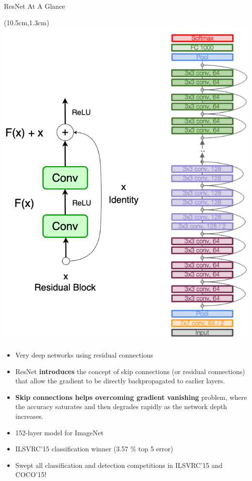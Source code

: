 \documentclass[serif, aspectratio=169]{beamer}
\begin{document}
\begin{frame}{ResNet At A Glance}
	
	\begin{textblock*}{5cm}(10.5cm,1.3cm) %
		\includegraphics[keepaspectratio, scale=0.23]{pic/resBlock}
	\end{textblock*}
	
	\begin{itemize}
		\item Very deep networks using residual connections
		\item ResNet \textbf{introduces} the concept of skip connections \newline (or residual connections) that allow the gradient to \newline be directly backpropagated to earlier layers.
		\item \textbf{Skip connections helps overcoming gradient vanishing} \newline problem, where the accuracy saturates and then \newline degrades rapidly as the network depth increases.
		\item 152-layer model for ImageNet
		\item ILSVRC’15 classification winner (3.57 \% top 5 error)
		\item Swept all classification and detection competitions \newline in ILSVRC’15 and COCO’15!
	\end{itemize}
\end{frame}
\end{document}
